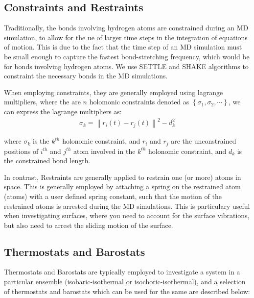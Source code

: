     \subsection{Constraints and Restraints}
    Traditionally, the bonds involving hydrogen atoms are constrained during an MD simulation, to allow for the ue of larger time steps in the integration of equations of motion. This is due to the fact that the time step of an MD simulation must be small enough to capture the fastest bond-stretching frequency, which would be for bonds involving hydrogen atoms.
    We use SETTLE\supercite{miyamoto_settle_1992} and SHAKE\supercite{ryckaert_numerical_1977} algorithms to constraint the necessary bonds in the MD simulations.

    When employing constraints, they are generally employed using lagrange multipliers, where the are $n$ holomonic constraints denoted as $\left\{ \sigma_1,\sigma_2,\cdots  \right\}$, we can express the lagrange multipliers as:
    \begin{align*}
        \sigma_k = \left\| r_i(t) - r_j(t)\right\|^2 - d_k^2
    \end{align*} 

    where $\sigma_k$ is the $k^{th}$ holonomic constraint, and $r_i$ and $r_j$ are the unconstrained positions of $i^{th}$ and $j^{th}$ atom involved in the $k^{th}$ holonomic constraint, and $d_{k}$ is the constrained bond length.

    In contrast, Restraints are generally applied to restrain one (or more) atoms in space. This is generally employed by attaching a spring on the restrained atom (atoms) with a user defined spring constant, such that the motion of the restrained atoms is arrested during the MD simulations. This is particulary useful when investigating surfaces, where you need to account for the surface vibrations, but also need to arrest the sliding motion of the surface.

    \subsection{Thermostats and Barostats}
    Thermostats and Barostats are typically employed to investigate a system in a particular ensemble (isobaric-isothermal or isochoric-isothermal), and a selection of thermostats and barostats which can be used for the same are described below: 

